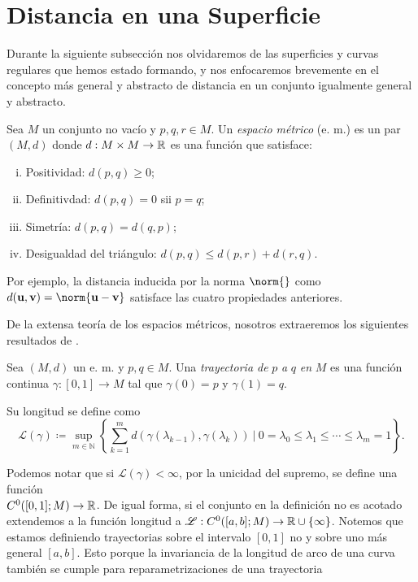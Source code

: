 \section{Distancia en una Superficie}

Durante la siguiente subsección nos olvidaremos de las superficies y curvas regulares que hemos estado formando, y nos enfocaremos brevemente en el concepto más general y abstracto de distancia en un conjunto igualmente general y abstracto.

\begin{definition}
	Sea $M$ un conjunto no vacío y $p, q, r \in M$. Un \emph{espacio métrico} (e. m.) es un par $(M, d)$ donde $d: M\times M \to \mathbb R$ es una función que satisface:
	\begin{enumerate}[(i)]
		\item Positividad: $d(p, q) \ge 0$;
		\item Definitivdad: $d(p, q) = 0$ sii $p = q$;
		\item Simetría: $d(p, q) = d(q, p)$;
		\item Desigualdad del triángulo: $d(p, q) \le d(p, r) + d(r, q)$.
	\end{enumerate}
\end{definition}
Por ejemplo, la distancia inducida por la norma $\norm{}$ como $d(\vec u, \vec v) = \norm{\vec u - \vec v}$ satisface las cuatro propiedades anteriores.

De la extensa teoría de los espacios métricos, nosotros extraeremos los siguientes resultados de \parencite{clapp-2010}.

\begin{definition}
	Sea $(M, d)$ un e. m. y $p, q \in M$. Una \emph{trayectoria de} $p$ \emph{a} $q$ \emph{en} $M$ es una función continua $\gamma : [0, 1] \to M$ tal que $\gamma(0) = p$ y $\gamma(1) = q$.
	
	Su longitud se define como
	\begin{equation}
		\mathscr L(\gamma) \coloneqq \sup_{m \in \mathbb N}\left\{ \sum_{k=1}^m d(\gamma(\lambda_{k-1}), \gamma(\lambda_k)) \  \biggr\rvert \ 0 = \lambda_0 \le \lambda_1 \le \dotsb \le \lambda_m = 1\right\}.
	\end{equation}
\end{definition}

Podemos notar que si $\mathscr L(\gamma) < \infty$, por la unicidad del supremo, se define una función\\ $C^0([0, 1]; M) \to \mathbb R$. De igual forma, si el conjunto en la definición no es acotado extendemos a la función longitud a $\mathscr L : C^0([a, b]; M) \to \mathbb R\cup\{\infty\}$. Notemos que estamos definiendo trayectorias sobre el intervalo $[0,1]$ no y sobre uno más general $[a,b]$. Esto porque la invariancia de la longitud de arco de una curva también se cumple para reparametrizaciones de una trayectoria

